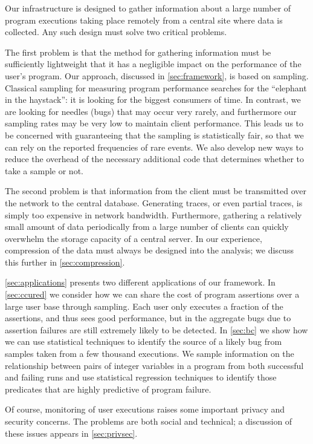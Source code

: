 Our infrastructure is designed to gather information about a large
number of program executions taking place remotely from a central site
where data is collected.  Any such design must solve two critical
problems.

The first problem is that the method for gathering information must be
sufficiently lightweight that it has a negligible impact on the
performance of the user's program.  Our approach, discussed in
\autoref{sec:framework}, is based on sampling.  Classical sampling for
measuring program performance searches for the ``elephant in the
haystack'': it is looking for the biggest consumers of time.  In
contrast, we are looking for needles (bugs) that may occur very
rarely, and furthermore our sampling rates may be very low to maintain
client performance.  This leads us to be concerned with guaranteeing
that the sampling is statistically fair, so that we can rely on the
reported frequencies of rare events.  We also develop new ways to
reduce the overhead of the necessary additional code that determines
whether to take a sample or not.

The second problem is that information from the client must be
transmitted over the network to the central database.  Generating
traces, or even partial traces, is simply too expensive in network
bandwidth.  Furthermore, gathering a relatively small amount of data
periodically from a large number of clients can quickly overwhelm the
storage capacity of a central server.  In our experience, compression
of the data must always be designed into the analysis; we discuss this
further in \autoref{sec:compression}.


\autoref{sec:applications} presents two different applications of our
framework.  In \autoref{sec:ccured} we consider how we can share the
cost of program assertions over a large user base through sampling.
Each user only executes a fraction of the assertions, and thus sees
good performance, but in the aggregate bugs due to assertion failures
are still extremely likely to be detected.  In \autoref{sec:bc} we
show how we can use statistical techniques to identify the source of a
likely bug from samples taken from a few thousand executions.  We
sample information on the relationship between pairs of integer
variables in a program from both successful and failing runs and use
statistical regression techniques to identify those predicates that
are highly predictive of program failure.

Of course, monitoring of user executions raises some important privacy
and security concerns.  The problems are both social and technical; a
discussion of these issues appears in \autoref{sec:privsec}.

